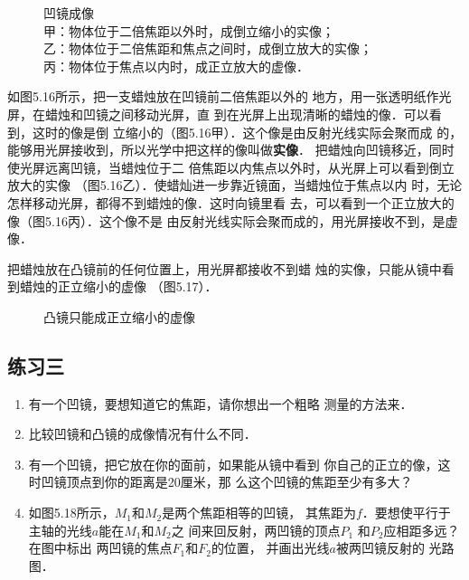 \begin{figure}[htp]
\begin{tikzpicture}[>=latex, scale=1.4]
\end{tikzpicture}
    \caption{凹镜成像\\
    甲：物体位于二倍焦距以外时，成倒立缩小的实像；\\
    乙：物体位于二倍焦距和焦点之间时，成倒立放大的实像；\\
    丙：物体位于焦点以内时，成正立放大的虚像．}
    \end{figure}

如图5.16所示，把一支蜡烛放在凹镜前二倍焦距以外的
地方，用一张透明纸作光屏，在蜡烛和凹镜之间移动光屏，直
到在光屏上出现清晰的蜡烛的像．可以看到，这时的像是倒
立缩小的（图5.16甲）．这个像是由反射光线实际会聚而成
的，能够用光屏接收到，所以光学中把这样的像叫做\textbf{实像}．
把蜡烛向凹镜移近，同时使光屏远离凹镜，当蜡烛位于二
倍焦距以内焦点以外时，从光屏上可以看到倒立放大的实像
（图5.16乙）．使蜡灿进一步靠近镜面，当蜡烛位于焦点以内
时，无论怎样移动光屏，都得不到蜡烛的像．这时向镜里看
去，可以看到一个正立放大的像（图5.16丙）．这个像不是
由反射光线实际会聚而成的，用光屏接收不到，是虚像．

把蜡烛放在凸镜前的任何位置上，用光屏都接收不到蜡
烛的实像，只能从镜中看到蜡烛的正立缩小的虚像
（图5.17）．
   \begin{figure}[htp]\centering
{}
        \caption{凸镜只能成正立缩小的虚像}
        \end{figure}

\subsection*{练习三}
\begin{enumerate}
    \item 有一个凹镜，要想知道它的焦距，请你想出一个粗略
        测量的方法来．
    \item 比较凹镜和凸镜的成像情况有什么不同．
    \item 有一个凹镜，把它放在你的面前，如果能从镜中看到
        你自己的正立的像，这时凹镜顶点到你的距离是20厘米，那
        么这个凹镜的焦距至少有多大？
    \item 如图5.18所示，$M_1$和$M_2$是两个焦距相等的凹镜，
    其焦距为$f$．要想使平行于主轴的光线$a$能在$M_1$和$M_2$之
    间来回反射，两凹镜的顶点$P_1$
    和$P_2$应相距多远？在图中标出
    两凹镜的焦点$F_1$和$F_2$的位置，
    并画出光线$a$被两凹镜反射的
    光路图．
\end{enumerate}

